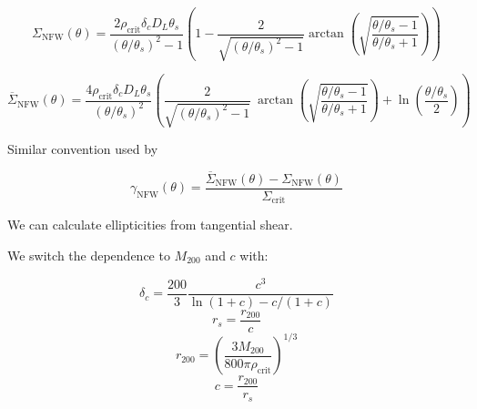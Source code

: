 \documentclass[10pt]{article}
\begin{document}

%
%
%

\begin{equation}
\Sigma_\mathrm{NFW}(\theta) = \frac{2 \rho_\mathrm{crit} \delta_c D_L \theta_s}{(\theta/\theta_s)^2 - 1} \left(1 - \frac{2}{\sqrt{(\theta/\theta_s)^2 - 1}} \arctan\left(\sqrt{\frac{\theta/\theta_s - 1}{\theta/\theta_s + 1}} \right) \right)
\end{equation}

\begin{equation}
\overline{\Sigma}_\mathrm{NFW}(\theta) = \frac{4 \rho_\mathrm{crit} \delta_c D_L \theta_s}{(\theta/\theta_s)^2} \left(
    \frac{2}{\sqrt{(\theta/\theta_s)^2 - 1}} ~\arctan\left(\sqrt{\frac{\theta/\theta_s - 1}{\theta/\theta_s + 1}} \right) + \ln{\left(\frac{\theta/\theta_s}{2}\right)}
\right)
\end{equation}

Similar convention used by \citet{Bartelmann2001}

\begin{equation}
\gamma_\mathrm{NFW}(\theta) = \frac{\overline{\Sigma}_\mathrm{NFW}(\theta) - \Sigma_\mathrm{NFW}(\theta)}{\Sigma_\mathrm{crit}}
\end{equation}

We can calculate ellipticities from tangential shear.

We switch the dependence to $M_{200}$ and $c$ with:

\begin{equation}
\delta_c = \frac{200}{3} \frac{c^3}{\ln(1 + c) - c/(1 + c)}
\end{equation}
\begin{equation}
r_s = \frac{r_{200}}{c}
\end{equation}
\begin{equation}
r_{200} = \left( \frac{3 M_{200}}{800 \pi \rho_\mathrm{crit}} \right)^{1/3}
\end{equation}
\begin{equation}
c = \frac{r_{200}}{r_s}
\end{equation}
\end{document}
